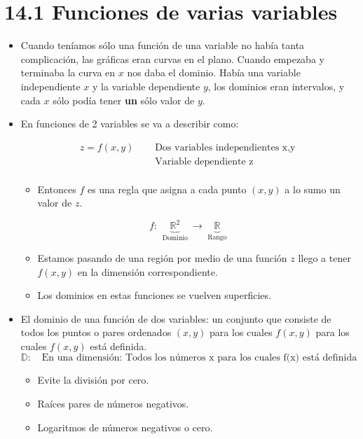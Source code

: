 \section{14.1 Funciones de varias variables}
\begin{itemize}
    \item Cuando teníamos sólo una función de una variable no había tanta complicación, las gráficas eran curvas en el plano. Cuando empezaba y terminaba la curva en $x$ nos daba el dominio. Había una variable independiente $x$ y la variable dependiente $y$, los dominios eran intervalos, y cada $x$ sólo podía tener \textbf{un} sólo valor de $y$.
    \item En funciones de 2 variables se va a describir como:  
        \begin{center}
           \begin{align*}
                z = f(x,y) \quad &\text{  Dos variables independientes x,y  } \\ 
                & \text{  Variable dependiente z  } \\ 
           \end{align*}
        \end{center}
        \begin{itemize}
            \item Entonces $f$ es una regla que asigna a cada punto $(x,y)$ a lo sumo un valor de $z$.
        \end{itemize}
        \[
          f: \, \underbrace{\mathbb{R}^2}_{\text{  Dominio  }} \rightarrow \underbrace{\mathbb{R}}_{\text{  Rango  }}
        \]
        \begin{itemize}
            \item Estamos pasando de una región por medio de una función $z$ llego a tener $f(x,y)$ en la dimensión correspondiente.
            \item Los dominios en estas funciones se vuelven superficies.
        \end{itemize}
    
    \item El dominio de una función de dos variables: un conjunto que consiste de todos los puntos o pares ordenados $(x,y)$ para los cuales $f(x,y)$ para los cuales $f(x,y)$ está definida.
        \[
          \mathbb{D}: \quad \text{En una dimensión: Todos los números x para los cuales f(x) está definida  }
        \]
        \begin{itemize}
            \item Evite la división por cero.
            \item Raíces pares de números negativos.
            \item Logaritmos de números negativos o cero.
        \end{itemize}
    

\end{itemize}
